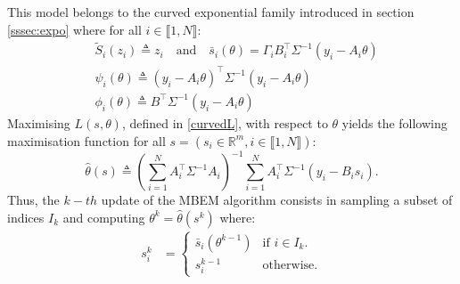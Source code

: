 \documentclass[11pt]{article}
\theoremstyle{plain}
\newcommand{\inter}{\llbracket1,N\rrbracket}
\theoremstyle{plain}
\theoremstyle{definition}
\begin{document}
This model belongs to the curved exponential family introduced in section \ref{sssec:expo} where for all $i \in \inter$:
\begin{align}\label{statmem}
& \tilde{S}_i(z_i) \triangleq z_i \quad \textrm{and} \quad \bar{s}_i(\theta) =  \Gamma_i B_i^\top\Sigma^{-1} (y_i - A_i\theta)\\
& \psi_i(\theta) \triangleq  (y_i - A_i\theta)^\top\Sigma^{-1}(y_i - A_i\theta)\\
& \phi_i(\theta) \triangleq B^\top \Sigma^{-1} (y_i - A_i\theta)
\end{align}
Maximising $L(s,\theta)$, defined in \eqref{curvedL}, with respect to $\theta$ yields the following maximisation function for all $s=(s_i \in \mathbb{R}^{m}, i \in \inter)$:
\begin{equation*}
\hat{\theta}(s) \triangleq \left(\sum_{i=1}^{N}{A_i^\top \Sigma^{-1}A_i}\right)^{-1}\sum_{i=1}^{N}{A_i^\top \Sigma^{-1}(y_i - B_i s_i)}.
\end{equation*}
Thus, the $k-th$ update of the MBEM algorithm consists in sampling a subset of indices $I_k$ and computing $\theta^k = \hat{\theta}(s^k)$ where:
\begin{align*}
  s_i^k &=
  \begin{cases}
   \bar{s}_i(\theta^{k-1})        & \text{if } i \in I_k. \\
   s_i^{k-1}         & \text{otherwise}.
  \end{cases}
\end{align*}
\end{document}
